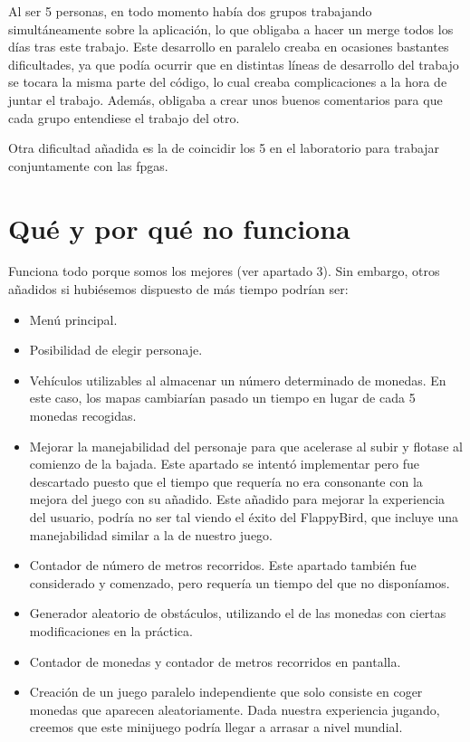 \documentclass[11pt, a4paper, spanish, openright, twoside]{book}
\begin{document}
Al ser 5 personas, en todo momento había dos grupos trabajando simultáneamente sobre la aplicación, lo que obligaba a hacer un merge todos los días tras este trabajo. Este desarrollo en paralelo
creaba en ocasiones bastantes dificultades, ya que podía ocurrir que en distintas líneas de desarrollo del trabajo se tocara la misma parte del código,  lo cual creaba complicaciones a la hora de juntar el trabajo. Además, 
obligaba a crear unos buenos comentarios para que cada grupo entendiese el trabajo del otro. 

Otra dificultad añadida es la de coincidir los 5  en el laboratorio para trabajar conjuntamente con las fpgas.

\section{Qué y por qué no funciona}
Funciona todo porque somos los mejores (ver apartado 3). Sin embargo, otros añadidos si hubiésemos dispuesto de más tiempo podrían ser:
	
\begin{itemize}
	\item Menú principal.
	\item Posibilidad de elegir personaje.
	\item Vehículos utilizables al almacenar un número determinado de monedas. En este caso, los mapas cambiarían pasado un tiempo en lugar de cada 5 monedas recogidas.
	\item Mejorar la  manejabilidad del personaje para que acelerase al subir y flotase al comienzo de la bajada. 
	Este apartado se intentó implementar pero fue descartado puesto que el tiempo que requería no era consonante con la mejora del juego con su añadido.
	Este añadido  para mejorar la experiencia del usuario, podría no ser tal viendo el éxito del FlappyBird, que incluye una manejabilidad similar a la de nuestro juego.
	\item Contador de número de metros recorridos. Este apartado también fue considerado y comenzado, pero requería un tiempo del que no disponíamos.
	\item Generador aleatorio de obstáculos, utilizando el de las monedas con ciertas modificaciones en la práctica.
	\item Contador de monedas y contador de metros recorridos en pantalla.
	\item Creación de un juego paralelo independiente que solo consiste en coger monedas que aparecen aleatoriamente. Dada nuestra experiencia jugando, creemos que este minijuego podría llegar a arrasar a nivel mundial.
\end{itemize}
\end{document}
